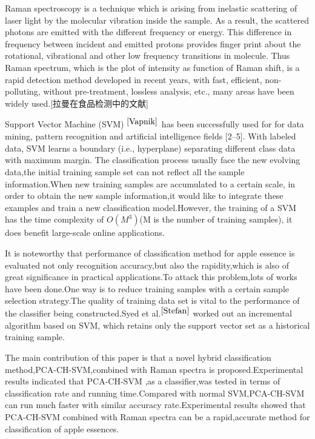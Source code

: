 \documentclass[a4paper]{article}
\begin{document}
Raman spectroscopy is a technique which is arising from inelastic scattering of laser light by the molecular vibration inside the sample. As a result, the scattered photons are emitted with the different frequency or energy. This difference in frequency between incident and emitted protons provides finger print about the rotational, vibrational and other low frequency transitions in molecule. Thus Raman spectrum, which is the plot of intensity as function of Raman shift, is a rapid detection method developed in recent years, with fast, efficient, non-polluting, without pre-treatment, lossless analysis, etc., many areas have been widely used.[拉曼在食品检测中的文献]

Support Vector Machine (SVM) $^{\cite{Vapnik}}$ has been successfully used for for data mining, pattern recognition and artiﬁcial intelligence ﬁelds [2–5]. With labeled data, SVM learns a boundary (i.e., hyperplane) separating different class data with maximum margin.
The classification process usually face the new evolving data,the initial training sample set can not reflect all the sample information.When new training samples are accumulated to a certain scale, in order to obtain the new sample information,it would like to integrate these examples and train a new classification model.However, the training of a SVM has the time complexity of $O(M^3)$(M is the number of training samples), it does benefit large-scale online applications.

It is noteworthy that performance of classification method for apple essence is evaluated not only recognition accuracy,but also the rapidity,which is also of great significance in practical applications.To attack this problem,lots of works have been done.One way is to reduce training samples with a certain sample selection strategy.The quality of training data set is vital to the performance of the classifier being constructed.Syed et al.$ ^{\cite{Stefan}}$ worked out an incremental algorithm based on SVM, which retains only the support vector set as a historical training sample.

The main contribution of this paper is that a novel hybrid classification method,PCA-CH-SVM,combined with Raman spectra is proposed.Experimental results indicated that PCA-CH-SVM ,as a classifier,was tested in terms of classification rate and running time.Compared with normal SVM,PCA-CH-SVM can run much faster with similar accuracy rate.Experimental results showed that PCA-CH-SVM combined with Raman spectra can be a rapid,accurate  method for classification of apple essences.
\end{document}
